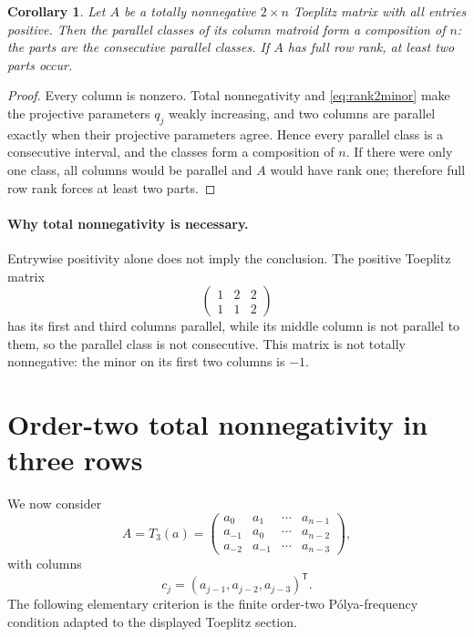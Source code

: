 \documentclass{amsart}
\numberwithin{equation}{section}
\newtheorem{corollary}[theorem]{Corollary}
\theoremstyle{definition}
\theoremstyle{remark}
\newcommand{\transpose}{\mathsf T}
\begin{document}
\begin{corollary}\label{cor:rank2positive}
Let $A$ be a totally nonnegative $2\times n$ Toeplitz matrix with all entries positive.  Then the parallel classes of its column matroid form a composition of $n$: the parts are the consecutive parallel classes.  If $A$ has full row rank, at least two parts occur.
\end{corollary}

\begin{proof}
Every column is nonzero.  Total nonnegativity and \eqref{eq:rank2minor} make the projective parameters $q_j$ weakly increasing, and two columns are parallel exactly when their projective parameters agree.  Hence every parallel class is a consecutive interval, and the classes form a composition of $n$.  If there were only one class, all columns would be parallel and $A$ would have rank one; therefore full row rank forces at least two parts.
\end{proof}

\paragraph{Why total nonnegativity is necessary.}
Entrywise positivity alone does not imply the conclusion.  The positive Toeplitz matrix
\[
 \begin{pmatrix}
 1&2&2\\
 1&1&2
 \end{pmatrix}
\]
has its first and third columns parallel, while its middle column is not parallel to them, so the parallel class is not consecutive.  This matrix is not totally nonnegative: the minor on its first two columns is $-1$.

\section{Order-two total nonnegativity in three rows}

We now consider
\begin{equation}\label{eq:rank3A}
 A=T_3(a)=
 \begin{pmatrix}
 a_0&a_1&\cdots&a_{n-1}\\
 a_{-1}&a_0&\cdots&a_{n-2}\\
 a_{-2}&a_{-1}&\cdots&a_{n-3}
 \end{pmatrix},
\end{equation}
with columns
\begin{equation}\label{eq:rank3col}
 c_j=(a_{j-1},a_{j-2},a_{j-3})^{\transpose}.
\end{equation}
The following elementary criterion is the finite order-two P\'olya-frequency condition adapted to the displayed Toeplitz section.
\end{document}

